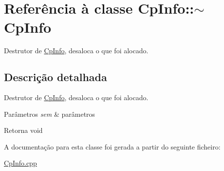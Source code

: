 \hypertarget{class_cp_info_1_1~_cp_info}{}\section{Referência à classe Cp\+Info\+:\+:$\sim$\+Cp\+Info}
\label{class_cp_info_1_1~_cp_info}


Destrutor de \hyperlink{class_cp_info}{Cp\+Info}, desaloca o que foi alocado.  




\subsection{Descrição detalhada}
Destrutor de \hyperlink{class_cp_info}{Cp\+Info}, desaloca o que foi alocado. 


\begin{DoxyParams}{Parâmetros}
{\em sem} & parâmetros \\
\hline
\end{DoxyParams}
\begin{DoxyReturn}{Retorna}
void 
\end{DoxyReturn}


A documentação para esta classe foi gerada a partir do seguinte ficheiro\+:\begin{DoxyCompactItemize}
\item 
\hyperlink{_cp_info_8cpp}{Cp\+Info.\+cpp}\end{DoxyCompactItemize}
